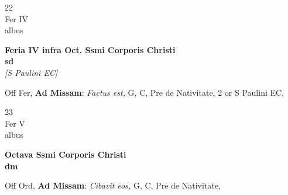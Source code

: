 \documentclass[10pt, openany]{book}
\begin{document}
        \begin{center}
            \begin{minipage}{3.5in}
                \vspace{2em}
                \begin{minipage}{0.5in}
                    {\Huge 22} \\
                    {\normalsize Fer IV} \\
                    {\normalsize albus}
                \end{minipage}
                \begin{minipage}{3.0in}
                    \textbf{ \large Feria IV infra Oct. Ssmi Corporis Christi \\
                    \textnormal{\normalsize sd}} \\ \textit{[S Paulini EC]} \\ 
                \end{minipage}
                \begin{justify}Off Fer, \textbf{Ad Missam}: \textit{Factus est,} G, C, Pre de Nativitate, 2 or S Paulini EC,  
                \end{justify}
            \end{minipage}
        \end{center}
    
        \begin{center}
            \begin{minipage}{3.5in}
                \vspace{2em}
                \begin{minipage}{0.5in}
                    {\Huge 23} \\
                    {\normalsize Fer V} \\
                    {\normalsize albus}
                \end{minipage}
                \begin{minipage}{3.0in}
                    \textbf{ \large Octava Ssmi Corporis Christi \\
                    \textnormal{\normalsize dm}} \\ 
                \end{minipage}
                \begin{justify}Off Ord, \textbf{Ad Missam}: \textit{Cibavit eos,} G, C, Pre de Nativitate,  
                \end{justify}
            \end{minipage}
        \end{center}
    
\end{document}
